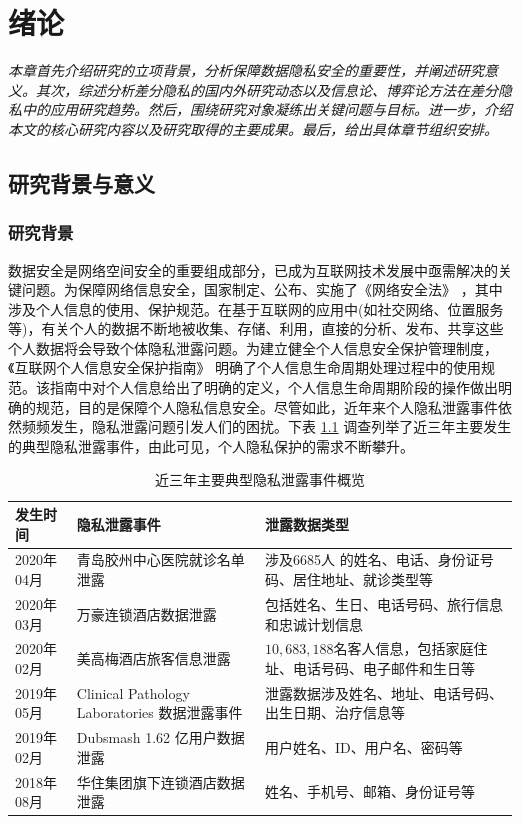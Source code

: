 \chapter{绪论}\label{chapter01}
{\em 本章首先介绍研究的立项背景，分析保障数据隐私安全的重要性，并阐述研究意义。其次，综述分析差分隐私的国内外研究动态以及信息论、博弈论方法在差分隐私中的应用研究趋势。然后，围绕研究对象凝练出关键问题与目标。进一步，介绍本文的核心研究内容以及研究取得的主要成果。最后，给出具体章节组织安排。}
\section{研究背景与意义}
\subsection{研究背景}

数据安全是网络空间安全的重要组成部分，已成为互联网技术发展中亟需解决的关键问题。为保障网络信息安全，国家制定、公布、实施了《网络安全法》\cite{network2016}%
，其中涉及个人信息的使用、保护规范。在基于互联网的应用中(如社交网络、位置服务等)，有关个人的数据不断地被收集、存储、利用，直接的分析、发布、共享这些个人数据将会导致个体隐私泄露问题。为建立健全个人信息安全保护管理制度，《互联网个人信息安全保护指南》\cite{individual2019}%
明确了个人信息生命周期处理过程中的使用规范。该指南中对个人信息给出了明确的定义，个人信息生命周期阶段的操作做出明确的规范，目的是保障个人隐私信息安全。尽管如此，近年来个人隐私泄露事件依然频频发生，隐私泄露问题引发人们的困扰。下表 \ref{tab:privacyLeakageEvents_1.1}
调查列举了近三年主要发生的典型隐私泄露事件，由此可见，个人隐私保护的需求不断攀升。

\begin{table}[htbp]
\caption{近三年主要典型隐私泄露事件概览}
\label{tab:privacyLeakageEvents_1.1}
\centering
\fontsize{10pt}{\baselineskip}\selectfont
\begin{tabular}{p{}p{}p{}}%
	\toprule
	\textbf{发生时间}&\textbf{隐私泄露事件}&\textbf{泄露数据类型}\\
	\midrule
    2020年04月 & 青岛胶州中心医院就诊名单泄露 & 涉及6685人 的姓名、电话、身份证号码、居住地址、就诊类型等\\
	2020年03月 & 万豪连锁酒店数据泄露 & 包括姓名、生日、电话号码、旅行信息和忠诚计划信息\\
	2020年02月 & 美高梅酒店旅客信息泄露 & $10,683,188$名客人信息，包括家庭住址、电话号码、电子邮件和生日等\\
	2019年05月 & Clinical Pathology Laboratories 数据泄露事件 &泄露数据涉及姓名、地址、电话号码、出生日期、治疗信息等\\
	2019年02月 & Dubsmash 1.62 亿用户数据泄露 & 用户姓名、ID、用户名、密码等 \\
	2018年08月 & 华住集团旗下连锁酒店数据泄露 & 姓名、手机号、邮箱、身份证号等\\
	
\bottomrule
\end{tabular}
\end{table}

